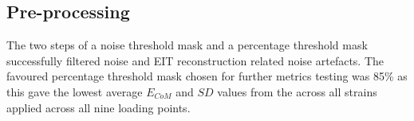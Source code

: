 
\subsection{Pre-processing}\label{Pre-processing3}
The two steps of a noise threshold mask and a percentage threshold mask successfully filtered noise and EIT reconstruction related noise artefacts. The favoured percentage threshold mask chosen for further metrics testing was 85\% as this gave the lowest average $E_{CoM}$ and $S\!D$ values from the across all strains applied across all nine loading points.

